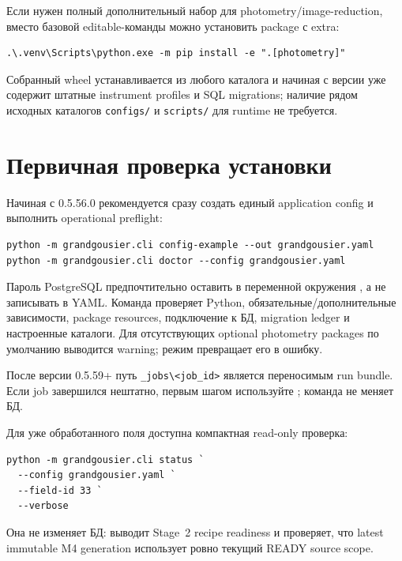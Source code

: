 Если нужен полный дополнительный набор для photometry/image-reduction, вместо базовой editable-команды можно установить package с extra:

\begin{lstlisting}
.\.venv\Scripts\python.exe -m pip install -e ".[photometry]"
\end{lstlisting}

Собранный wheel устанавливается из любого каталога и начиная с версии \manualversion{} уже содержит штатные instrument profiles и SQL migrations; наличие рядом исходных каталогов \texttt{configs/} и \texttt{scripts/} для runtime не требуется.


\section{Первичная проверка установки}

Начиная с 0.5.56.0 рекомендуется сразу создать единый application config и выполнить operational preflight:

\begin{lstlisting}
python -m grandgousier.cli config-example --out grandgousier.yaml
python -m grandgousier.cli doctor --config grandgousier.yaml
\end{lstlisting}

Пароль PostgreSQL предпочтительно оставить в переменной окружения , а не записывать в YAML. Команда  проверяет Python, обязательные/дополнительные зависимости, package resources, подключение к БД, migration ledger и настроенные каталоги. Для отсутствующих optional photometry packages по умолчанию выводится warning; режим  превращает его в ошибку.

После  версии 0.5.59+ путь \texttt{\_jobs\textbackslash <job\_id>} является переносимым run bundle. Если job завершился нештатно, первым шагом используйте ; команда не меняет БД.

Для уже обработанного поля доступна компактная read-only проверка:

\begin{lstlisting}
python -m grandgousier.cli status `
  --config grandgousier.yaml `
  --field-id 33 `
  --verbose
\end{lstlisting}

Она не изменяет БД: выводит Stage~2 recipe readiness и проверяет, что latest immutable M4 generation использует ровно текущий READY source scope.

